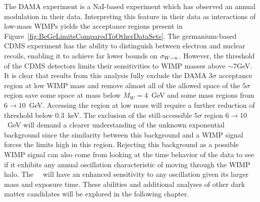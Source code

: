 The DAMA experiment is a NaI-based experiment which has observed an annual modulation in their data.  Interpreting this feature in their data as interactions of low-mass WIMPs yields the acceptance regions present in Figure~\ref{fig:BeGeLimitsComparedToOtherDataSets}.  The germanium-based CDMS experiment has the ability to distinguish between electron and nuclear recoils, enabling it to achieve far lower bounds on $\sigma_{W-n}$.  However, the threshold of the CDMS detectors limits their sensitivities to WIMP masses above $\sim7$GeV.  It is clear that results from this analysis fully exclude the DAMA $3\sigma$ acceptance region at low WIMP mass and remove almost all of the allowed space of the $5\sigma$ region save some space at mass below $M_{W}=4$~GeV and some mass regions from $6\to10$~GeV.  Accessing the region at low mass will require a further reduction of threshold below 0.3~keV. %
The exclusion of the still-accessible $5\sigma$ region $6\to10$~GeV will demand a clearer understanding of the unknown exponential background since the similarity between this background and a WIMP signal forces the limits high in this region.  Rejecting this background as a possible WIMP signal can also come from looking at the time behavior of the data to see if it exhibits any annual oscillation characteristic of moving through the WIMP halo.  The \MJ~\minmod~will have an enhanced sensitivity to any oscillation given its larger mass and exposure time.  These abilities and additional analyses of other dark matter candidates will be explored in the following chapter.









